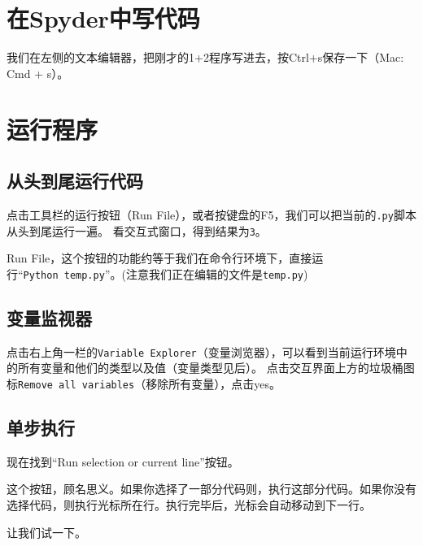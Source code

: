\documentclass[
]{book}
\begin{document}
\hypertarget{ux5728spyderux4e2dux5199ux4ee3ux7801}{%
\section{在Spyder中写代码}\label{ux5728spyderux4e2dux5199ux4ee3ux7801}}

我们在左侧的文本编辑器，把刚才的1+2程序写进去，按Ctrl+s保存一下（Mac: Cmd + s）。

\hypertarget{ux8fd0ux884cux7a0bux5e8f}{%
\section{运行程序}\label{ux8fd0ux884cux7a0bux5e8f}}

\hypertarget{ux4eceux5934ux5230ux5c3eux8fd0ux884cux4ee3ux7801}{%
\subsection{从头到尾运行代码}\label{ux4eceux5934ux5230ux5c3eux8fd0ux884cux4ee3ux7801}}

点击工具栏的运行按钮（Run File），或者按键盘的F5，我们可以把当前的\texttt{.py}脚本从头到尾运行一遍。
看交互式窗口，得到结果为\texttt{3}。

Run File，这个按钮的功能约等于我们在命令行环境下，直接运行``\texttt{Python\ temp.py}''。(注意我们正在编辑的文件是\texttt{temp.py})

\hypertarget{ux53d8ux91cfux76d1ux89c6ux5668}{%
\subsection{变量监视器}\label{ux53d8ux91cfux76d1ux89c6ux5668}}

点击右上角一栏的\texttt{Variable\ Explorer}（变量浏览器），可以看到当前运行环境中的所有变量和他们的类型以及值（变量类型见后）。
点击交互界面上方的垃圾桶图标\texttt{Remove\ all\ variables}（移除所有变量），点击yes。

\hypertarget{ux5355ux6b65ux6267ux884c}{%
\subsection{单步执行}\label{ux5355ux6b65ux6267ux884c}}

现在找到``Run selection or current line''按钮。

这个按钮，顾名思义。如果你选择了一部分代码则，执行这部分代码。如果你没有选择代码，则执行光标所在行。执行完毕后，光标会自动移动到下一行。

让我们试一下。
\end{document}
